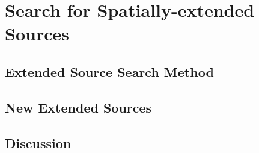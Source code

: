 
\chapter{Search for Spatially-extended Sources}

\section{Extended Source Search Method}

\section{New Extended Sources}

\section{Discussion}
